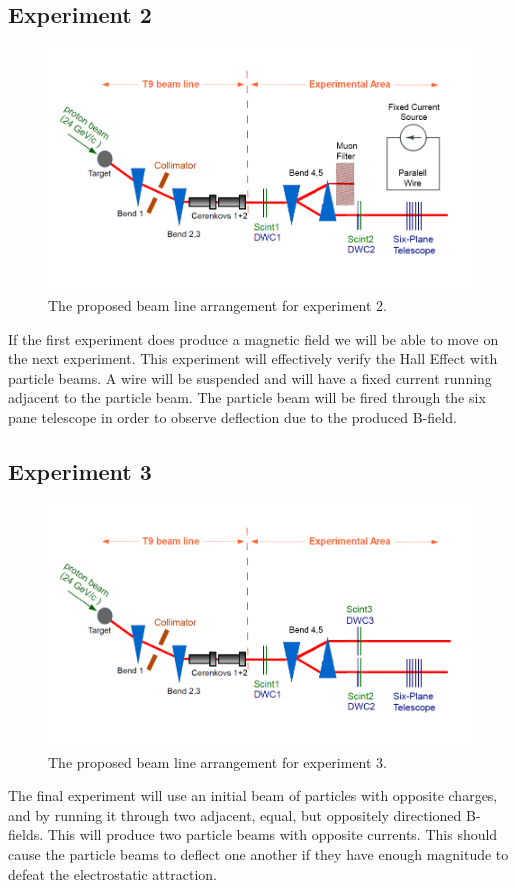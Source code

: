 \documentclass[12pt,letterpaper]{article}
\begin{document}
\subsection{Experiment 2}
\begin{figure}[H]
\label{experiment_setup2}
  \centering
\includegraphics[]{experimental_setup2.png}
 \caption{The proposed beam line arrangement for experiment 2.}
\end{figure}
If the first experiment does produce a magnetic field we will be able to move on the next experiment.
This experiment will effectively verify the Hall Effect with particle beams. 
A wire will be suspended and will have a fixed current running adjacent to the particle beam.
The particle beam will be fired through the six pane telescope in order to observe deflection due to the produced B-field.

\subsection{Experiment 3}
\begin{figure}[H]
\label{experiment_setup3}
  \centering
\includegraphics[]{experimental_setup3.png}
 \caption{The proposed beam line arrangement for experiment 3.}
\end{figure}


The final experiment will use an initial beam of particles with opposite charges, and by running it through two adjacent, equal, but oppositely directioned B-fields.
This will produce two particle beams with opposite currents. 
This should cause the particle beams to deflect one another if they have enough magnitude to defeat the electrostatic attraction.
\end{document}
